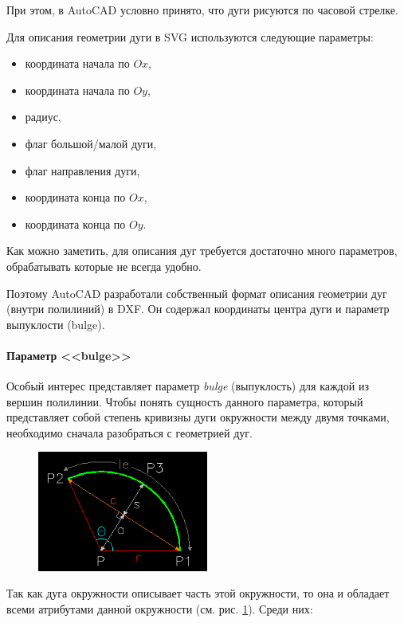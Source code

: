 При этом, в AutoCAD условно принято, что дуги рисуются по часовой стрелке.

Для описания геометрии дуги в SVG используются следующие параметры:
\begin{itemize}
	\item координата начала по $Ox$,
	\item координата начала по $Oy$,
	\item радиус,
	\item флаг большой/малой дуги,
	\item флаг направления дуги,
	\item координата конца по $Ox$,
	\item координата конца по $Oy$.
\end{itemize}

Как можно заметить, для описания дуг требуется достаточно много параметров, обрабатывать которые не всегда удобно.

Поэтому AutoCAD разработали собственный формат описания геометрии дуг (внутри полилиний) в DXF. Он содержал координаты центра дуги и параметр выпуклости (bulge).

\paragraph{Параметр <<bulge>>}\label{sec:bulge}

Особый интерес представляет параметр \textit{bulge} (выпуклость) для каждой из вершин полилинии.
Чтобы понять сущность данного параметра, который представляет собой степень кривизны дуги окружности между двумя точками, необходимо сначала разобраться с геометрией дуг.

\begin{figure}[H]
	\centering
	\includegraphics[width=0.5\textwidth]{figures/arcgeom.png}
	\label{fig:arcgeom}
\end{figure}

Так как дуга окружности описывает часть этой окружности, то она и обладает всеми атрибутами данной окружности (см. рис. \ref{fig:arcgeom}). Среди них:

